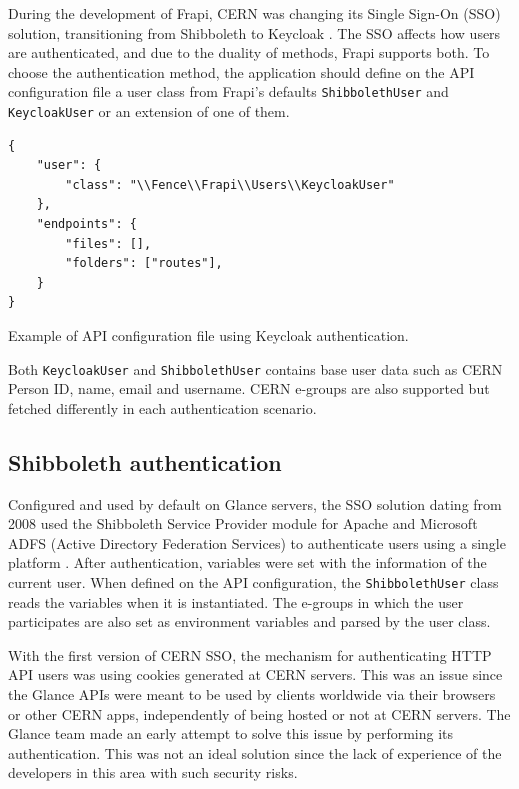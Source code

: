 During the development of Frapi, CERN was changing its Single Sign-On (SSO) solution, transitioning from Shibboleth \cite{shibboleth-website} to Keycloak \cite{keycloak-website}. The SSO affects how users are authenticated, and due to the duality of methods, Frapi supports both. To choose the authentication method, the application should define on the API configuration file a user class from Frapi's defaults \texttt{ShibbolethUser} and \texttt{KeycloakUser} or an extension of one of them.

\begin{listing}[htbp]
\begin{verbatim}
{
    "user": {
        "class": "\\Fence\\Frapi\\Users\\KeycloakUser"
    },
    "endpoints": {
        "files": [],
        "folders": ["routes"],
    }
}
\end{verbatim}
\caption{Example of API configuration file using Keycloak authentication.}
\end{listing}

Both \texttt{KeycloakUser} and \texttt{ShibbolethUser} contains base user data such as CERN Person ID, name, email and username. CERN e-groups are also supported but fetched differently in each authentication scenario.

\subsection{Shibboleth authentication}

Configured and used by default on Glance servers, the SSO solution dating from 2008 used the Shibboleth Service Provider module for Apache and Microsoft ADFS (Active Directory Federation Services) to authenticate users using a single platform \cite{shibboleth-article}. After authentication, variables were set with the information of the current user. When defined on the API configuration, the \texttt{ShibbolethUser} class reads the variables when it is instantiated. The e-groups in which the user participates are also set as environment variables and parsed by the user class.

With the first version of CERN SSO, the mechanism for authenticating HTTP API users was using cookies generated at CERN servers. This was an issue since the Glance APIs were meant to be used by clients worldwide via their browsers or other CERN apps, independently of being hosted or not at CERN servers. The Glance team made an early attempt to solve this issue by performing its authentication. This was not an ideal solution since the lack of experience of the developers in this area with such security risks.

